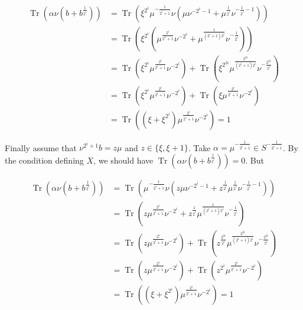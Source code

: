 \documentclass[10pt]{article}
\begin{document}
$$
\begin{aligned}
\operatorname{Tr}\left(\alpha \nu\left(b+b^{\frac{1}{2^{i}}}\right)\right) & =\operatorname{Tr}\left(\xi^{2^{i}} \mu^{-\frac{1}{2^{i}+1}} \nu\left(\mu \nu^{-2^{i}-1}+\mu^{\frac{1}{2^{i}}} \nu^{-\frac{1}{2^{i}}-1}\right)\right) \\
& =\operatorname{Tr}\left(\xi^{2^{i}}\left(\mu^{\frac{2^{i}}{2^{2}+1}} \nu^{-2^{i}}+\mu^{\frac{1}{\left(2^{i}+1\right) 2^{i}}} \nu^{-\frac{1}{2^{i}}}\right)\right) \\
& =\operatorname{Tr}\left(\xi^{2^{i}} \mu^{\frac{2^{i}}{2^{i}+1}} \nu^{-2^{i}}\right)+\operatorname{Tr}\left(\xi^{2^{3 i}} \mu^{\frac{2^{2 i}}{\left(2^{i}+1\right) 2^{i}}} \nu^{-\frac{2^{2 i}}{2^{i}}}\right) \\
& =\operatorname{Tr}\left(\xi^{2^{i}} \mu^{\frac{2^{i}}{2^{i}+1}} \nu^{-2^{i}}\right)+\operatorname{Tr}\left(\xi \mu^{\frac{2^{i}}{2^{i}+1}} \nu^{-2^{i}}\right) \\
& =\operatorname{Tr}\left(\left(\xi+\xi^{2^{i}}\right) \mu^{\frac{2^{i}}{2^{i}+1}} \nu^{-2^{i}}\right)=1
\end{aligned}
$$

Finally assume that $\nu^{2^{i}+1} b=z \mu$ and $z \in\{\xi, \xi+1\}$. Take $\alpha=\mu^{-\frac{1}{2^{i}+1}} \in S^{-\frac{1}{2^{i}+1}}$. By the condition defining $X$, we should have $\operatorname{Tr}\left(\alpha \nu\left(b+b^{\frac{1}{2^{i}}}\right)\right)=0$. But

$$
\begin{aligned}
\operatorname{Tr}\left(\alpha \nu\left(b+b^{\frac{1}{2^{i}}}\right)\right) & =\operatorname{Tr}\left(\mu^{-\frac{1}{2^{i}+1}} \nu\left(z \mu \nu^{-2^{i}-1}+z^{\frac{1}{2^{i}}} \mu^{\frac{1}{2^{i}}} \nu^{-\frac{1}{2^{i}}-1}\right)\right) \\
& =\operatorname{Tr}\left(z \mu^{\frac{2^{i}}{2^{i}+1}} \nu^{-2^{i}}+z^{\frac{1}{2^{i}}} \mu^{\frac{1}{\left(2^{i}+1\right) 2^{i}}} \nu^{-\frac{1}{2^{i}}}\right) \\
& =\operatorname{Tr}\left(z \mu^{\frac{2^{i}}{2^{i}+1}} \nu^{-2^{i}}\right)+\operatorname{Tr}\left(z^{\frac{2^{2 i}}{2^{i}}} \mu^{\frac{2^{2 i}}{\left(2^{i}+1\right) 2^{i}}} \nu^{-\frac{2^{2 i}}{2^{i}}}\right) \\
& =\operatorname{Tr}\left(z \mu^{\frac{2^{i}}{2^{i}+1}} \nu^{-2^{i}}\right)+\operatorname{Tr}\left(z^{2^{i}} \mu^{\frac{2^{i}}{2^{i}+1}} \nu^{-2^{i}}\right) \\
& =\operatorname{Tr}\left(\left(\xi+\xi^{2^{i}}\right) \mu^{\frac{2^{i}}{2^{i}+1}} \nu^{-2^{i}}\right)=1
\end{aligned}
$$
\end{document}
